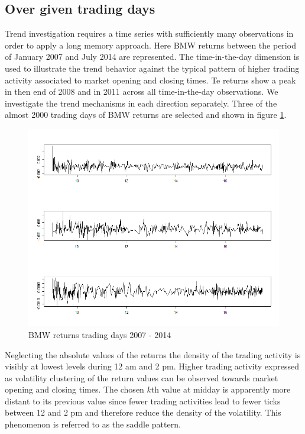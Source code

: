 \documentclass[12pt]{article}
\begin{document}
\subsection{Over given trading days}
\label{tradingdays}
Trend investigation requires a time series with sufficiently many observations in order to apply a long memory approach. Here BMW returns between the period of January 2007 and July 2014 are represented. The time-in-the-day dimension is used to illustrate the trend behavior against the typical pattern of higher trading activity associated to market opening and closing times. Te returns show a peak in then end of 2008 and in 2011 across all time-in-the-day observations. We investigate the trend mechanisms in each direction separately. 
Three of the almost 2000 trading days of BMW returns are selected and shown in figure \ref{figure:5.1b}. 
\begin{figure}[ht] 
	\centering
	\includegraphics[width=1\textwidth]{Ret_trading_days_01.png}
	\caption{BMW returns trading days 2007 - 2014}
	\label{figure:5.1b}
\end{figure}
Neglecting the absolute values of the returns the density of the trading activity is visibly at lowest levels during 12 am and 2 pm. Higher trading activity expressed as volatility clustering of the return values can be observed towards market opening and closing times. The chosen \(k\)th value at midday is apparently more distant to its previous value since fewer trading activities lead to fewer ticks between 12 and 2 pm and therefore reduce the density of the volatility. This phenomenon is referred to as the saddle pattern. 
\end{document}
